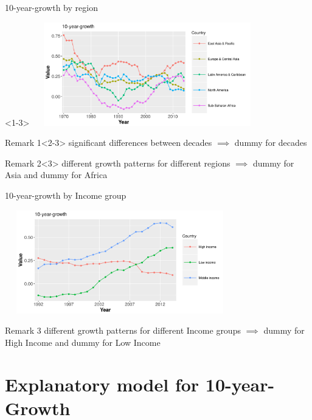 \documentclass[9pt]{beamer}
\begin{document}
\begin{frame}{10-year-growth by region}
	\begin{block}{}<1-3>
		\includegraphics[height=4.5cm,width=10cm]{growth_region.png}
	\end{block}
	
		\begin{block}{Remark 1}<2-3>
			significant differences between decades $\implies$ dummy for decades
		\end{block}
		\begin{block}{Remark 2}<3>
			different growth patterns for different regions $\implies$ dummy for Asia and dummy for Africa
		\end{block}
		

\end{frame}

\begin{frame}{10-year-growth by Income group}
	\begin{block}{}
		\includegraphics[height=4.5cm,width=10cm]{growth_income.png}
	\end{block}
	\begin{block}{Remark 3}
		different growth patterns for different Income groups $\implies$ dummy for High Income and dummy for Low Income
	\end{block}
\end{frame}




\section{Explanatory model for 10-year-Growth}
\end{document}
